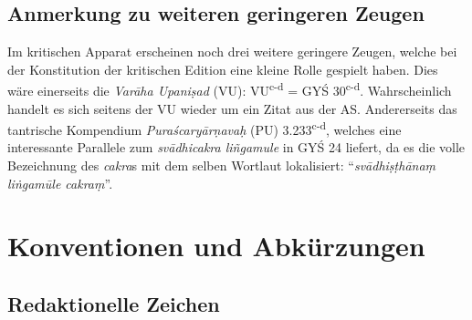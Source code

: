\documentclass[a4paper,12pt]{article}
\begin{document}
\subsection{Anmerkung zu weiteren geringeren Zeugen}

Im kritischen Apparat erscheinen noch drei weitere geringere Zeugen, welche bei der Konstitution der kritischen Edition eine kleine Rolle gespielt haben. Dies wäre einerseits die \textit{Varāha Upaniṣad} (VU): VU\textsuperscript{c-d} = GYŚ 30\textsuperscript{c-d}. Wahrscheinlich handelt es sich seitens der VU wieder um ein Zitat aus der AS. Andererseits das tantrische Kompendium \textit{Puraścaryārṇavaḥ} (PU) 3.233\textsuperscript{c-d}, welches eine interessante Parallele zum \textit{svādhicakra liñgamule} in GYŚ 24 liefert, da es die volle Bezeichnung des \textit{cakra}s mit dem selben Wortlaut lokalisiert: ``\textit{svādhiṣṭhānaṃ liṅgamūle cakraṃ}''. 

\clearpage

\section{Konventionen und Abkürzungen}
\label{konv}

\subsection{Redaktionelle Zeichen}
\label{redz}
\end{document}
